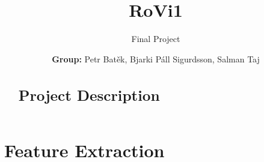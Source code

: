 \documentclass[]{scrartcl}
\title{RoVi1}
\subtitle{Final Project \vspace{2cm}}
\author{\textbf{Group:} Petr Batěk,  Bjarki Páll Sigurdsson, Salman Taj}
\begin{document}
	
	\maketitle
	
	\newpage

\begin{abstract}
\section*{Project Description}

\end{abstract}

\section{Feature Extraction}
\end{document}
